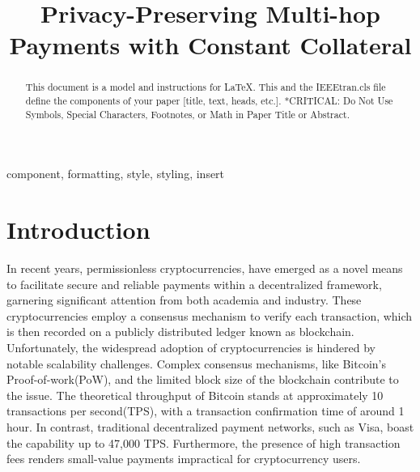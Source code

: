 \documentclass[conference]{IEEEtran}
\begin{document}
\title{Privacy-Preserving Multi-hop Payments with Constant Collateral}

\author{
\and
{}
}

\maketitle


\begin{abstract}
This document is a model and instructions for \LaTeX.
This and the IEEEtran.cls file define the components of your paper [title, text, heads, etc.]. *CRITICAL: Do Not Use Symbols, Special Characters, Footnotes, 
or Math in Paper Title or Abstract.
\end{abstract}

\begin{IEEEkeywords}
component, formatting, style, styling, insert
\end{IEEEkeywords}

\section{Introduction}
In recent years, permissionless cryptocurrencies, have emerged as a novel means to facilitate secure
and reliable payments within a decentralized framework, garnering significant attention from both academia and industry. 
These cryptocurrencies employ a consensus mechanism to verify each transaction, which is
then recorded on a publicly distributed ledger known as blockchain. Unfortunately, 
the widespread adoption of cryptocurrencies is hindered by notable scalability challenges. Complex consensus mechanisms, like Bitcoin's Proof-of-work(PoW), 
and the limited block size of the blockchain contribute to the issue. The theoretical
throughput of Bitcoin stands at approximately 10 transactions per second(TPS), with a transaction confirmation time of 
around 1 hour. In contrast, traditional decentralized payment networks, 
such as Visa, boast the capability up to 47,000 TPS. Furthermore, the presence of high transaction fees renders small-value 
payments impractical for cryptocurrency users.
\end{document}
